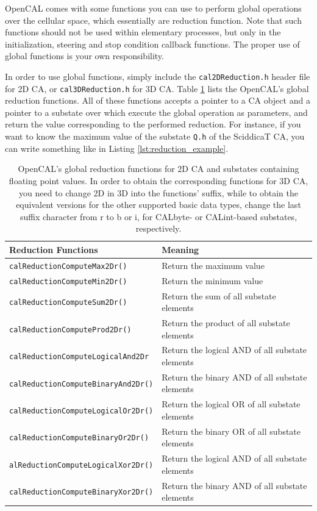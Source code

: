 OpenCAL comes with some functions you can use to perform global
operations over the cellular space, which essentially are reduction
function. Note that such functions should not be used within
elementary processes, but only in the initialization, steering and
stop condition callback functions. The proper use of global functions
is your own responsibility.

In order to use global functions, simply include the
\verb'cal2DReduction.h' header file for 2D CA, or
\verb'cal3DReduction.h' for 3D CA. Table \ref{tab:reductions} lists
the OpenCAL's global reduction functions. All of these functions
accepts a pointer to a CA object and a pointer to a substate over
which execute the global operation as parameters, and return the value
corresponding to the performed reduction. For instance, if you want to
know the maximum value of the substate \verb'Q.h' of the SciddicaT CA,
you can write something like in Listing \ref{lst:reduction_example}.



\begin{table}
  \centering
  \footnotesize
  \begin{tabular}{l|l}
    \hline
    Reduction Functions & Meaning \\
    \hline
    \hline
    \verb'calReductionComputeMax2Dr()'       & Return the maximum value\\
    \verb'calReductionComputeMin2Dr()'       & Return the minimum value\\
    \verb'calReductionComputeSum2Dr()'       & Return the sum of all substate elements\\
    \verb'calReductionComputeProd2Dr()'      & Return the product of all substate elements\\
    \verb'calReductionComputeLogicalAnd2Dr'  & Return the logical AND of all substate elements\\
    \verb'calReductionComputeBinaryAnd2Dr()' & Return the binary AND of all substate elements\\
    \verb'calReductionComputeLogicalOr2Dr()' & Return the logical OR of all substate elements\\
    \verb'calReductionComputeBinaryOr2Dr()'  & Return the binary OR of all substate elements\\
    \verb'alReductionComputeLogicalXor2Dr()' & Return the logical AND of all substate elements\\
    \verb'calReductionComputeBinaryXor2Dr()' & Return the binary AND of all substate elements\\
    \hline
  \end{tabular}
  \caption{OpenCAL's global reduction functions for 2D CA and
    substates containing floating point values. In order to obtain the
    corresponding functions for 3D CA, you need to change 2D in 3D
    into the functions' suffix, while to obtain the equivalent
    versions for the other supported basic data types, change the last
    suffix character from r to b or i, for CALbyte- or CALint-based
    substates, respectively.}
  \label{tab:reductions}
\end{table}


